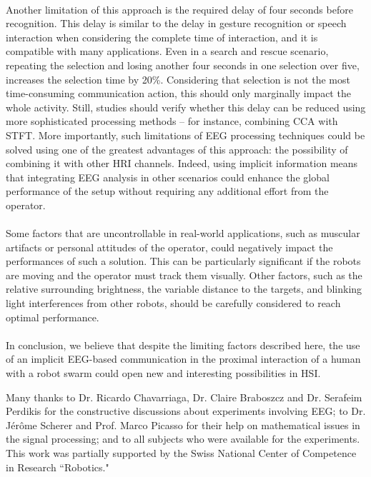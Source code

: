 \documentclass[smallextended]{svjour3}
\begin{document}
\\
Another limitation of this approach is the required delay of four seconds before recognition.
This delay is similar to the delay in gesture recognition or speech interaction when considering the complete time of interaction, and it is compatible with many applications. Even in a search and rescue scenario, repeating the selection and losing another four seconds in one selection over five, increases the selection time by 20\%. 
Considering that selection is not the most time-consuming communication action, this should only marginally impact the whole activity. Still, studies should verify whether this delay can be reduced using more sophisticated processing methods -- for instance, combining CCA with STFT.
More importantly, such limitations of EEG processing techniques could be solved using one of the greatest advantages of this approach: the possibility of combining it with other HRI channels.
Indeed, using implicit information means that integrating EEG analysis in other scenarios could enhance the global performance of the setup without requiring any additional effort from the operator.\\
\\
Some factors that are uncontrollable in real-world applications, such as muscular artifacts or personal attitudes of the operator, could negatively impact the performances of such a solution.
This can be particularly significant if the robots are moving and the operator must track them visually. 
Other factors, such as the relative surrounding brightness, the variable distance to the targets, and blinking light interferences from other robots, should be carefully considered to reach optimal performance. \\
\\
In conclusion, we believe that despite the limiting factors described here, the use of an implicit EEG-based communication in the proximal interaction of a human with a robot swarm could open new and interesting possibilities in HSI.\\




\begin{acknowledgement}
Many thanks to Dr. Ricardo Chavarriaga, Dr. Claire Braboszcz and Dr. Serafeim Perdikis for the constructive discussions about experiments involving EEG; to Dr. J\'er\^ome Scherer and Prof. Marco Picasso for their help on mathematical issues in the signal processing; and to all subjects who were available for the experiments. This work was partially supported by the Swiss National Center of Competence in Research ``Robotics."
\end{acknowledgement}


\end{document}
